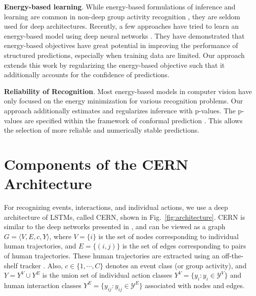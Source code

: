 \documentclass[10pt,twocolumn,letterpaper]{article}
\begin{document}
{\bf Energy-based learning}.  While energy-based formulations of inference and learning are common in non-deep group activity recognition \cite{Ramananthan2013,Amer2014,Choi2014,Shu2015}, they are seldom used for deep architectures. Recently, a few approaches have tried to learn an energy-based model \cite{LeCun2005,LeCun2006} using deep neural networks \cite{Belanger2016,Zhao2016}. They have demonstrated that energy-based objectives have great potential in improving the performance of structured predictions, especially when training data are limited. Our approach extends this work by regularizing the energy-based objective such that it additionally accounts for the confidence of predictions.


{\bf Reliability of Recognition}. Most energy-based models in computer vision have only focused on the energy minimization for various recognition problems. Our approach additionally estimates and regularizes inference with p-values. The p-values are specified within the framework of conformal prediction \cite{Shafer2008}. This allows the selection of more reliable and numerically stable predictions.






\section{Components of the CERN Architecture}\label{sec:CERNformulation}

For recognizing events, interactions, and individual actions, we use a deep architecture of LSTMs, called CERN, shown in Fig.~\ref{fig:architecture}. CERN is similar to the deep networks presented in \cite{Ibrahim2016,Jain2016}, and can be viewed as a graph $G = \langle V, E, c, Y\rangle$, where $V = \{i\}$ is the set of nodes corresponding to individual human trajectories, and $E = \{(i,j)\}$ is the set of edges corresponding to pairs of human trajectories. These human trajectories are extracted using an off-the-shelf tracker \cite{Danelljan2014}. Also, $c \in\{1,\cdots,C\}$ denotes an event class (or group activity), and $Y = Y^V \cup Y^E$ is the union set of individual action classes $Y^V=\{y_i:y_i \in \mathcal{Y}^V\}$ and human interaction classes $Y^E = \{y_{ij}:y_{ij} \in \mathcal{Y}^E\}$ associated with nodes and edges. %
\end{document}
